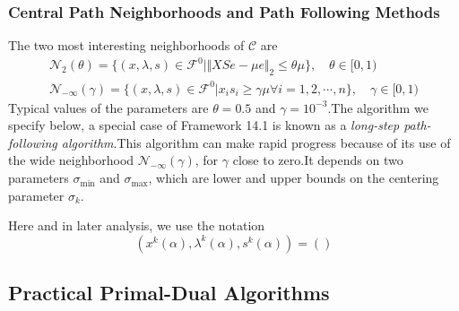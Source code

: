 \subsubsection{Central Path Neighborhoods and Path Following Methods}
The two most interesting neighborhoods of $\mathcal{C}$ are
\begin{align}
    \mathcal{N}_2(\theta) = \{(x, \lambda, s)\in\mathcal{F}^0 | \Vert XSe - \mu e \Vert_2 \leq \theta\mu \} , \quad \theta\in [0, 1) \tag{14.17}\label{ipm: 14.17}\\
        \mathcal{N}_{-\infty}(\gamma) = \{(x, \lambda, s)\in\mathcal{F}^0 | x_i s_i\geq\gamma\mu \forall i = 1,2,\cdots,n  \} , \quad \gamma\in [0, 1) \tag{14.18}\label{ipm: 14.18}
\end{align}
Typical values of the parameters are $\theta = 0.5$ and $\gamma = 10^{-3}$.The algorithm we specify below, a special case
of Framework 14.1 is known as a \textit{long-step path-following algorithm}.This algorithm can make rapid progress because of
its use of the wide neighborhood $\mathcal{N}_{-\infty}(\gamma)$, for $\gamma$ close to zero.It depends on two parameters
$\sigma_{\min}$ and $\sigma_{\max}$, which are lower and upper bounds on the centering parameter $\sigma_k$.
\par Here and in later analysis, we use the notation
\[
    (x^k(\alpha), \lambda^k(\alpha), s^k(\alpha)) = ()
\]

\subsection{Practical Primal-Dual Algorithms} \label{subsec:-practical-primal-dual-algorithms}
